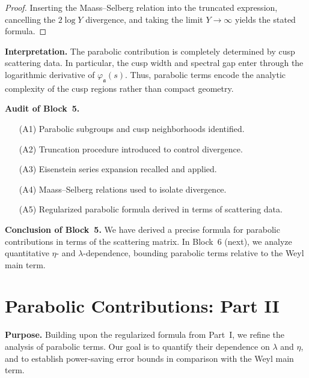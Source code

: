 \begin{proof}
Inserting the Maass–Selberg relation into the truncated expression,  
cancelling the $2\log Y$ divergence,  
and taking the limit $Y\to\infty$ yields the stated formula.
\end{proof}

\medskip

\noindent\textbf{Interpretation.}
The parabolic contribution is completely determined by cusp scattering data.  
In particular, the cusp width and spectral gap enter through the logarithmic derivative of $\varphi_\mathfrak{a}(s)$.  
Thus, parabolic terms encode the analytic complexity of the cusp regions rather than compact geometry.

\medskip

\noindent\textbf{Audit of Block~5.}
\begin{itemize}
  \item[(A1)] Parabolic subgroups and cusp neighborhoods identified.
  \item[(A2)] Truncation procedure introduced to control divergence.
  \item[(A3)] Eisenstein series expansion recalled and applied.
  \item[(A4)] Maass–Selberg relations used to isolate divergence.
  \item[(A5)] Regularized parabolic formula derived in terms of scattering data.
\end{itemize}

\medskip

\noindent\textbf{Conclusion of Block~5.}
We have derived a precise formula for parabolic contributions in terms of the scattering matrix.  
In Block~6 (next), we analyze quantitative $\eta$- and $\lambda$-dependence,  
bounding parabolic terms relative to the Weyl main term.


\section{Parabolic Contributions: Part II}

\noindent\textbf{Purpose.}
Building upon the regularized formula from Part~I,  
we refine the analysis of parabolic terms.  
Our goal is to quantify their dependence on $\lambda$ and $\eta$,  
and to establish power-saving error bounds in comparison with the Weyl main term.

